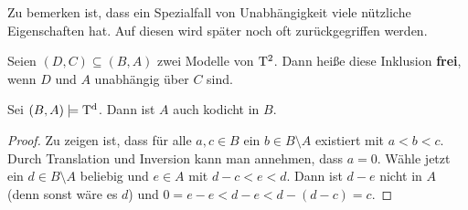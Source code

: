 Zu bemerken ist, dass ein Spezialfall von Unabhängigkeit viele nützliche Eigenschaften hat. Auf diesen wird später noch oft zurückgegriffen werden.
\begin{definition}
	Seien $(D,C)\subseteq(B,A)$ zwei Modelle von $\operatorname{T^2}$. Dann heiße diese Inklusion \textbf{frei}, wenn $D$ und $A$ unabhängig über $C$ sind.
\end{definition}

\begin{lemma}\label{Kodichte von A}
	Sei $(B,A)\models\operatorname{T^d}$. Dann ist $A$ auch kodicht in $B$.
\end{lemma}
\begin{proof}
	Zu zeigen ist, dass für alle $a,c\in B$ ein $b\in B\setminus A$ existiert mit $a<b<c$. Durch Translation und Inversion kann man annehmen, dass $a=0$. Wähle jetzt ein $d\in B\setminus A$ beliebig und $e\in A$ mit $d-c<e<d$. Dann ist $d-e$ nicht in $A$ (denn sonst wäre es $d$) und $0=e-e<d-e<d-(d-c)=c$.
\end{proof}

